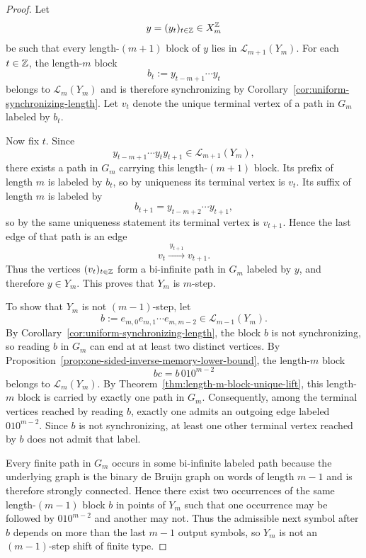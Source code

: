 \begin{proof}
Let
\[
y=(y_t)_{t\in\mathbb{Z}}\in X_m^{\mathbb{Z}}
\]
be such that every length-$(m+1)$ block of $y$ lies in
$\mathcal L_{m+1}(Y_m)$.  For each $t\in\mathbb{Z}$, the length-$m$ block
\[
b_t:=y_{t-m+1}\cdots y_t
\]
belongs to $\mathcal L_m(Y_m)$ and is therefore synchronizing by
Corollary~\ref{cor:uniform-synchronizing-length}.  Let $v_t$ denote the unique
terminal vertex of a path in $G_m$ labeled by $b_t$.

Now fix $t$.  Since
\[
y_{t-m+1}\cdots y_ty_{t+1}\in\mathcal L_{m+1}(Y_m),
\]
there exists a path in $G_m$ carrying this length-$(m+1)$ block.  Its prefix
of length $m$ is labeled by $b_t$, so by uniqueness its terminal vertex is
$v_t$.  Its suffix of length $m$ is labeled by
\[
b_{t+1}=y_{t-m+2}\cdots y_{t+1},
\]
so by the same uniqueness statement its terminal vertex is $v_{t+1}$.  Hence
the last edge of that path is an edge
\[
v_t\xrightarrow{\,y_{t+1}\,}v_{t+1}.
\]
Thus the vertices $(v_t)_{t\in\mathbb{Z}}$ form a bi-infinite path in $G_m$ labeled by
$y$, and therefore $y\in Y_m$.  This proves that $Y_m$ is $m$-step.

To show that $Y_m$ is not $(m-1)$-step, let
\[
b:=e_{m,0}e_{m,1}\cdots e_{m,m-2}\in\mathcal L_{m-1}(Y_m).
\]
By Corollary~\ref{cor:uniform-synchronizing-length}, the block $b$ is not
synchronizing, so reading $b$ in $G_m$ can end at at least two distinct
vertices.  By Proposition~\ref{prop:one-sided-inverse-memory-lower-bound}, the
length-$m$ block
\[
bc=b\,010^{m-2}
\]
belongs to $\mathcal L_m(Y_m)$.  By
Theorem~\ref{thm:length-m-block-unique-lift}, this length-$m$ block is carried
by exactly one path in $G_m$.  Consequently, among the terminal vertices
reached by reading $b$, exactly one admits an outgoing edge labeled
$010^{m-2}$.  Since $b$ is not synchronizing, at least one other terminal
vertex reached by $b$ does not admit that label.

Every finite path in $G_m$ occurs in some bi-infinite labeled path because the
underlying graph is the binary de Bruijn graph on words of length $m-1$ and is
therefore strongly connected.  Hence there exist two occurrences of the same
length-$(m-1)$ block $b$ in points of $Y_m$ such that one occurrence may be
followed by $010^{m-2}$ and another may not.  Thus the admissible next symbol
after $b$ depends on more than the last $m-1$ output symbols, so $Y_m$ is not
an $(m-1)$-step shift of finite type.
\end{proof}

